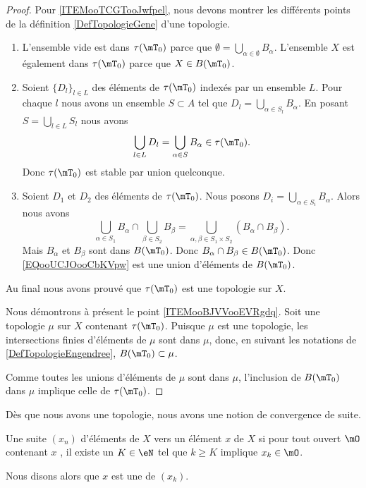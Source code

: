 \begin{proof}
	Pour \ref{ITEMooTCGTooJwfpel}, nous devons montrer les différents points de la définition \ref{DefTopologieGene} d'une topologie.
	\begin{enumerate}
		\item
		      L'ensemble vide est dans \( \tau(\mT_0)\) parce que \( \emptyset=\bigcup_{\alpha\in \emptyset}B_{\alpha}\). L'ensemble \( X\) est également dans \( \tau(\mT_0)\) parce que \( X\in B(\mT_0)\).

		\item
		      Soient \( \{ D_l \}_{l\in L}\) des éléments de \( \tau(\mT_0)\) indexés par un ensemble \( L\). Pour chaque \( l\) nous avons un ensemble \( S\subset A\) tel que \( D_l=\bigcup_{\alpha\in S_l}B_{\alpha}\). En posant \( S=\bigcup_{l\in L}S_l\) nous avons
		      \begin{equation}
			      \bigcup_{l\in L} D_l=\bigcup_{\alpha\in S}B_{\alpha}\in \tau(\mT_0).
		      \end{equation}
		      Donc \( \tau(\mT_0)\) est stable par union quelconque.
		\item
		      Soient \( D_1\) et \( D_2\) des éléments de \( \tau(\mT_0)\). Nous posons \( D_i=\bigcup_{\alpha\in S_i}B_{\alpha}\). Alors nous avons
		      \begin{equation}        \label{EQooUCJOooCbKVpw}
			      \bigcup_{\alpha\in S_1}B_{\alpha}\cap\bigcup_{\beta\in S_2}B_{\beta}=\bigcup_{\alpha,\beta\in S_1\times S_2}(B_{\alpha}\cap B_{\beta}).
		      \end{equation}
		      Mais \( B_{\alpha}\) et \( B_{\beta}\) sont dans \( B(\mT_0)\). Donc \( B_{\alpha}\cap B_{\beta}\in B(\mT_0)\). Donc \eqref{EQooUCJOooCbKVpw} est une union d'éléments de \( B(\mT_0)\).
	\end{enumerate}
	Au final nous avons prouvé que \( \tau(\mT_0)\) est une topologie sur \( X\).

	Nous démontrons à présent le point \ref{ITEMooBJVVooEVRgdq}. Soit une topologie \( \mu\) sur \( X\) contenant \( \tau(\mT_0)\). Puisque \( \mu\) est une topologie, les intersections finies d'éléments de \( \mu\) sont dans \( \mu\), donc, en suivant les notations de \ref{DefTopologieEngendree}, \( B(\mT_0)\subset \mu\).

	Comme toutes les unions d'éléments de \( \mu\) sont dans \( \mu\), l'inclusion de \( B(\mT_0)\) dans \( \mu\) implique celle de \( \tau(\mT_0)\).
\end{proof}


Dès que nous avons une topologie, nous avons une notion de convergence de suite.
\begin{definition} \label{DefXSnbhZX}
	Une suite \( (x_n)\) d'éléments de \( X\)  vers un élément \( x\) de \( X\) si pour tout ouvert \(\mO \)  contenant \( x\) , il existe un \( K\in \eN\) tel que \( k\geq K\) implique \( x_k\in\mO\).

	Nous disons alors que \( x\) est une  de \( (x_k)\).
\end{definition}

